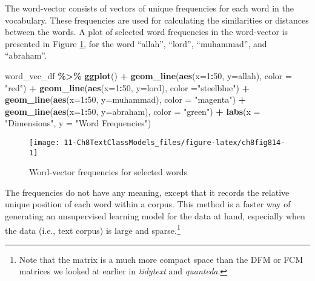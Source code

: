 \documentclass[
]{article}
\newenvironment{Shaded}{\begin{snugshade}}{\end{snugshade}}
\newcommand{\AttributeTok}[1]{\textcolor[rgb]{0.13,0.29,0.53}{#1}}
\newcommand{\DecValTok}[1]{\textcolor[rgb]{0.00,0.00,0.81}{#1}}
\newcommand{\FunctionTok}[1]{\textcolor[rgb]{0.13,0.29,0.53}{\textbf{#1}}}
\newcommand{\NormalTok}[1]{#1}
\newcommand{\SpecialCharTok}[1]{\textcolor[rgb]{0.81,0.36,0.00}{\textbf{#1}}}
\newcommand{\StringTok}[1]{\textcolor[rgb]{0.31,0.60,0.02}{#1}}
\begin{document}
\normalsize

The word-vector consists of vectors of unique frequencies for each word in the vocabulary. These frequencies are used for calculating the similarities or distances between the words. A plot of selected word frequencies in the word-vector is presented in Figure \ref{fig:ch8fig814}, for the word ``allah'', ``lord'', ``muhammad'', and ``abraham''.

\begin{Shaded}
\begin{Highlighting}[]
\NormalTok{word\_vec\_df }\SpecialCharTok{\%\textgreater{}\%} \FunctionTok{ggplot}\NormalTok{() }\SpecialCharTok{+} \FunctionTok{geom\_line}\NormalTok{(}\FunctionTok{aes}\NormalTok{(}\AttributeTok{x=}\DecValTok{1}\SpecialCharTok{:}\DecValTok{50}\NormalTok{, }\AttributeTok{y=}\NormalTok{allah), }\AttributeTok{color =} \StringTok{"red"}\NormalTok{) }\SpecialCharTok{+}
                    \FunctionTok{geom\_line}\NormalTok{(}\FunctionTok{aes}\NormalTok{(}\AttributeTok{x=}\DecValTok{1}\SpecialCharTok{:}\DecValTok{50}\NormalTok{, }\AttributeTok{y=}\NormalTok{lord), }\AttributeTok{color =}\StringTok{"steelblue"}\NormalTok{) }\SpecialCharTok{+}
                    \FunctionTok{geom\_line}\NormalTok{(}\FunctionTok{aes}\NormalTok{(}\AttributeTok{x=}\DecValTok{1}\SpecialCharTok{:}\DecValTok{50}\NormalTok{, }\AttributeTok{y=}\NormalTok{muhammad), }\AttributeTok{color =} \StringTok{"magenta"}\NormalTok{) }\SpecialCharTok{+}
                    \FunctionTok{geom\_line}\NormalTok{(}\FunctionTok{aes}\NormalTok{(}\AttributeTok{x=}\DecValTok{1}\SpecialCharTok{:}\DecValTok{50}\NormalTok{, }\AttributeTok{y=}\NormalTok{abraham), }\AttributeTok{color =} \StringTok{"green"}\NormalTok{) }\SpecialCharTok{+}
                    \FunctionTok{labs}\NormalTok{(}\AttributeTok{x =} \StringTok{"Dimensions"}\NormalTok{, }\AttributeTok{y =} \StringTok{"Word Frequencies"}\NormalTok{)}
\end{Highlighting}
\end{Shaded}

\begin{figure}

{\centering \texttt{[image: 11-Ch8TextClassModels\_files/figure-latex/ch8fig814-1]} 

}

\caption{Word-vector frequencies for selected words}\label{fig:ch8fig814}
\end{figure}

The frequencies do not have any meaning, except that it records the relative unique position of each word within a corpus. This method is a faster way of generating an unsupervised learning model for the data at hand, especially when the data (i.e., text corpus) is large and sparse.\footnote{Note that the matrix is a much more compact space than the DFM or FCM matrices we looked at earlier in \emph{tidytext} and \emph{quanteda}.}
\end{document}
